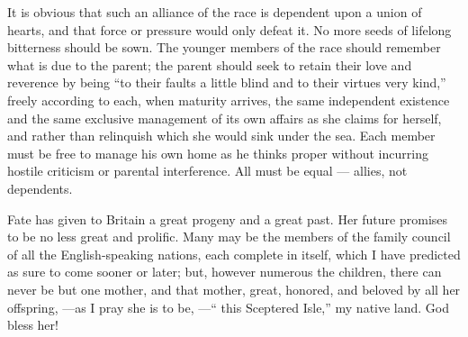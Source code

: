 \documentclass[11pt,openany]{book}
\begin{document}
It is obvious that such an alliance of the race is dependent upon a union of hearts, and that force or pressure would only defeat it. No more seeds of lifelong bitterness should be sown. The younger members of the race should remember what is due to the parent; the parent should seek to retain their love and reverence by being ``to their faults a little blind and to their virtues very kind,'' freely according to each, when maturity arrives, the same independent existence and the same exclusive management of its own affairs as she claims for herself, and rather than relinquish which she would sink under the sea. Each member must be free to manage his own home as he thinks proper without incurring hostile criticism or parental interference. All must be equal --- allies, not dependents.

Fate has given to Britain a great progeny and a great past. Her future promises to be no less great and prolific. Many may be the members of the family council of all the English-speaking nations, each complete in itself, which I have predicted as sure to come sooner or later; but, however numerous the children, there can never be but one mother, and that mother, great, honored, and beloved by all her offspring, ---as I pray she is to be, ---`` this Sceptered Isle,'' my native land. God bless her!
\end{document}
